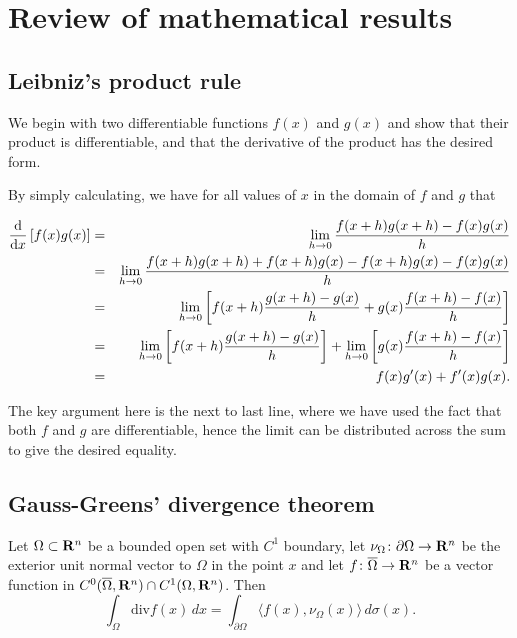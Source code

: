 \chapter{Review of mathematical results}
\label{additional-proofs}

\section{Leibniz's product rule}
\label{product-rule}

We begin with two differentiable functions $f(x)$ and $g(x)$ and show
that their product is differentiable, and that the derivative of the
product has the desired form. 

By simply calculating, we have for all values of $x$ in the domain of
$f$ and $g$ that 

\begin{eqnarray*}
\frac{\mathrm{d}}{\mathrm{d}x}\left[f(x)g(x)\right]
& = & \lim_{h\to0}\frac{f(x+h)g(x+h) - f(x)g(x)}{h} \\
& = & \lim_{h\to0}\frac{f(x+h)g(x+h) + f(x+h)g(x) - f(x+h)g(x) -
  f(x)g(x)}{h} \\ 
& = & \lim_{h\to0}\left[f(x+h)\frac{g(x+h)-g(x)}{h} +
  g(x)\frac{f(x+h)-f(x)}{h}\right] \\ 
& = & \lim_{h\to0}\left[f(x+h)\frac{g(x+h)-g(x)}{h}\right] +
\lim_{h\to0}\left[g(x)\frac{f(x+h)-f(x)}{h}\right] \\ 
& = & f(x)g'(x) + f'(x)g(x).
\end{eqnarray*}

The key argument here is the next to last line, where we have used the
fact that both $f$ and $g$ are differentiable, hence the limit can be
distributed across the sum to give the desired equality.

\section{Gauss-Greens' divergence theorem}
\label{gauss-divergence}


\begin{theorem}[Theorem]
Let $\Omega\subset \mathbf R^n$ be a bounded open set with $C^1$ boundary, let $\nu_\Omega\colon \partial \Omega\to \mathbf R^n$ be the exterior unit normal vector to $\Omega$ in the point $x$ and let $f\colon \overline{\Omega}\to \mathbf R^n$ be a vector function in $C^0(\overline\Omega,\mathbf R^n)\cap C^1(\Omega,\mathbf R^n)$. Then
\[
\int_\Omega \mathrm{div} f(x)\, dx
=\int_{\partial \Omega} \langle f(x),\nu_\Omega(x)\rangle \, d\sigma(x).
\]
\end{theorem}

